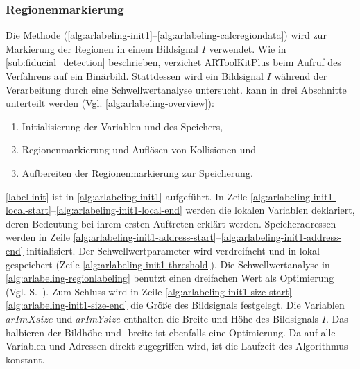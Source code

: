 \subsubsection{Regionenmarkierung} %
\label{sec:regionenmarkierung}

Die Methode  (\autoref{alg:arlabeling-init1}--\autoref{alg:arlabeling-calcregiondata}) wird zur
 Markierung der Regionen in einem Bildsignal $I$ verwendet. Wie in \autoref{sub:fiducial_detection} beschrieben,
 verzichet ARToolKitPlus beim Aufruf des Verfahrens auf ein Binärbild. Stattdessen wird ein Bildsignal $I$ während der
 Verarbeitung durch eine Schwellwertanalyse untersucht.  kann in drei Abschnitte unterteilt werden
 (Vgl. \autoref{alg:arlabeling-overview}):

\begin{enumerate}
	\item Initialisierung der Variablen und des Speichers, \label{label-init}
	\item Regionenmarkierung und Auflösen von Kollisionen und \label{label-region}
	\item Aufbereiten der Regionenmarkierung zur Speicherung. \label{label-cleaning}
\end{enumerate}



\autoref{label-init} ist in \autoref{alg:arlabeling-init1} aufgeführt. In Zeile
 \ref{alg:arlabeling-init1-local-start}--\ref{alg:arlabeling-init1-local-end} werden die lokalen Variablen deklariert,
 deren Bedeutung bei ihrem ersten Auftreten erklärt werden. Speicheradressen werden in Zeile
 \ref{alg:arlabeling-init1-address-start}--\ref{alg:arlabeling-init1-address-end} initialisiert. Der
 Schwellwertparameter wird verdreifacht und in lokal gespeichert (Zeile \ref{alg:arlabeling-init1-threshold}). Die
 Schwellwertanalyse in \autoref{alg:arlabeling-regionlabeling} benutzt einen dreifachen Wert als Optimierung
 (Vgl. S.~\pageref{sub:arlabel-threshold}). Zum Schluss wird in Zeile
 \ref{alg:arlabeling-init1-size-start}--\ref{alg:arlabeling-init1-size-end} die Größe des Bildsignals festgelegt. Die
 Variablen $\mathit{arImXsize}$ und $\mathit{arImYsize}$ enthalten die Breite und Höhe des Bildsignals $I$. Das
 halbieren der Bildhöhe und -breite ist ebenfalls eine Optimierung. Da auf alle Variablen und Adressen direkt
 zugegriffen wird, ist die Laufzeit des Algorithmus konstant.



